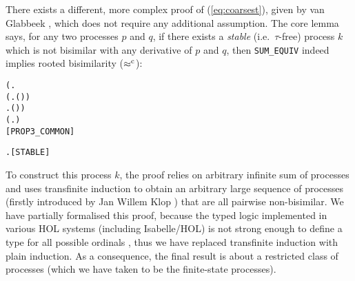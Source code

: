 There exists a different, more complex proof of (\ref{eq:coarsest}),
given by van Glabbeek \cite{van2005characterisation}, which does not
require any additional assumption.
The core lemma says, for
any two processes $p$ and $q$, if there exists a \emph{stable} (i.e.~$\tau$-free)
 process $k$ which is not bisimilar with any derivative of $p$ and
 $q$, then \texttt{SUM_EQUIV} indeed implies rooted bisimilarity ($\mathrel{\approx^{\rm{c}}}$):
\begin{alltt}
\HOLTokenTurnstile{} (\HOLSymConst{\HOLTokenExists{}}.
          \HOLSymConst{\HOLTokenConj{}} (\HOLSymConst{\HOLTokenForall{}} .  \HOLTokenWeakTransBegin{}\HOLTokenWeakTransEnd {} \HOLSymConst{\HOLTokenImp{}} \HOLSymConst{\HOLTokenNeg{}}( \HOLSymConst{\HOLTokenWeakEQ} )) \HOLSymConst{\HOLTokenConj{}}
        \HOLSymConst{\HOLTokenForall{}} .  \HOLTokenWeakTransBegin{}\HOLTokenWeakTransEnd {} \HOLSymConst{\HOLTokenImp{}} \HOLSymConst{\HOLTokenNeg{}}( \HOLSymConst{\HOLTokenWeakEQ} )) \HOLSymConst{\HOLTokenImp{}}
   (\HOLSymConst{\HOLTokenForall{}}.  \HOLSymConst{\ensuremath{+}}  \HOLSymConst{\HOLTokenWeakEQ}  \HOLSymConst{\ensuremath{+}} ) \HOLSymConst{\HOLTokenImp{}}
    \HOLSymConst{\HOLTokenObsCongr} \hfill{[PROP3_COMMON]}
\end{alltt}
\begin{alltt}
  \HOLSymConst{\HOLTokenEquiv{}} \HOLSymConst{\HOLTokenForall{}} .  \HOLTokenTransBegin{}\HOLTokenTransEnd {} \HOLSymConst{\HOLTokenImp{}}  \HOLSymConst{\HOLTokenNotEqual{}} \HOLSymConst{\ensuremath{\tau}}\hfill{[STABLE]}
\end{alltt}
To construct this process $k$,
 the proof relies on arbitrary infinite sum of 
processes and uses transfinite induction to obtain
an arbitrary large sequence of processes (firstly introduced by Jan
Willem Klop \cite{van2005characterisation})
 that are all pairwise non-bisimilar.
We have partially formalised
this proof, because the typed logic
implemented in various HOL systems (including Isabelle/HOL) is not
strong enough to define a type for all possible ordinals
\cite{norrish2013ordinals}, thus
we have replaced transfinite induction with plain induction. As a
consequence, the final
result is about a restricted class of processes (which we have taken
to be the finite-state processes).

